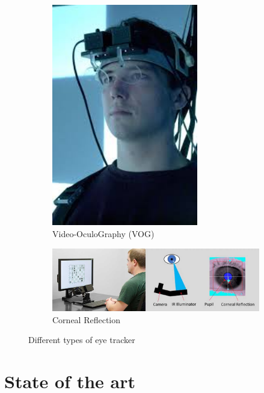 \documentclass{article}
\begin{document}
\begin{figure}[ht]
    \vspace{0.5em}
    
    \begin{subfigure}[b]{0.45\textwidth}
        \centering
        \includegraphics[width=0.7\textwidth,height=0.6\textwidth]{Images/Theory/vog.jpeg}
        \caption{Video-OculoGraphy (VOG)}
        \label{fig:vog}
    \end{subfigure}
    \hfill
    \begin{subfigure}[b]{0.45\textwidth}
        \centering
        \includegraphics[width=1\textwidth,height=0.6\textwidth]{Images/Theory/corneal.jpg}
        \caption{Corneal Reflection}
        \label{fig:corneal}
    \end{subfigure}

    \caption{Different types of eye tracker}
    \label{fig:four_grid}
\end{figure}

\newpage
\section{State of the art}
\end{document}

